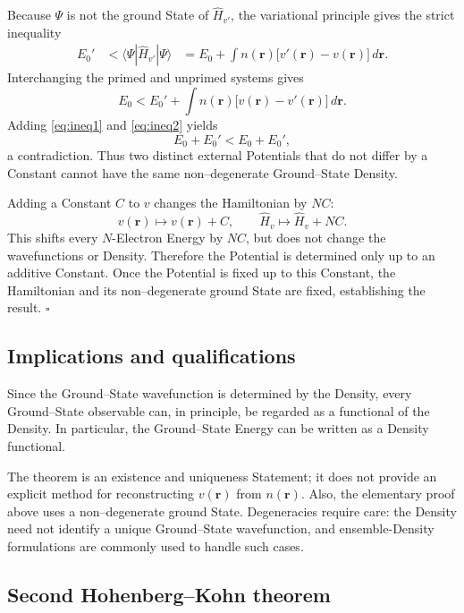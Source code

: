 \documentclass[a4paper, 10pt, onepage]{elegantbook}
\begin{document}
{Because \(\Psi\) is not the ground State of \(\hat H_{v'}\), the
variational principle gives the strict inequality
\begin{align}
E_0'
&<\langle\Psi|\hat H_{v'}|\Psi\rangle
&=E_0+\int n(\mathbf r)
\bigl[v'(\mathbf r)-v(\mathbf r)\bigr]\,d\mathbf r.
\label{eq:ineq1}
\end{align}
Interchanging the primed and unprimed systems gives
\begin{equation}
E_0
<
E_0'+\int n(\mathbf r)
\bigl[v(\mathbf r)-v'(\mathbf r)\bigr]\,d\mathbf r.
\label{eq:ineq2}
\end{equation}
Adding \eqref{eq:ineq1} and \eqref{eq:ineq2} yields
\begin{equation}
E_0+E_0'<E_0+E_0',
\end{equation}
a contradiction. Thus two distinct external Potentials that do not
differ by a Constant cannot have the same non--degenerate Ground--State
Density.

Adding a Constant \(C\) to \(v\) changes the Hamiltonian by \(NC\):
\begin{equation}
v(\mathbf r)\longmapsto v(\mathbf r)+C,
\qquad
\hat H_v\longmapsto\hat H_v+NC.
\end{equation}
This shifts every \(N\)-Electron Energy by \(NC\), but does not change
the wavefunctions or Density. Therefore the Potential is determined
only up to an additive Constant. Once the Potential is fixed up to
this Constant, the Hamiltonian and its non--degenerate ground State are
fixed, establishing the result.
\hfill\(\square\)

\subsection{Implications and qualifications}

Since the Ground--State wavefunction is determined by the Density,
every Ground--State observable can, in principle, be regarded as a
functional of the Density. In particular, the Ground--State Energy can
be written as a Density functional.

The theorem is an existence and uniqueness Statement; it does not
provide an explicit method for reconstructing \(v(\mathbf r)\) from
\(n(\mathbf r)\). Also, the elementary proof above uses a
non--degenerate ground State. Degeneracies require care: the Density
need not identify a unique Ground--State wavefunction, and
ensemble-Density formulations are commonly used to handle such
cases.

\subsection{Second Hohenberg--Kohn theorem}

}
\end{document}

